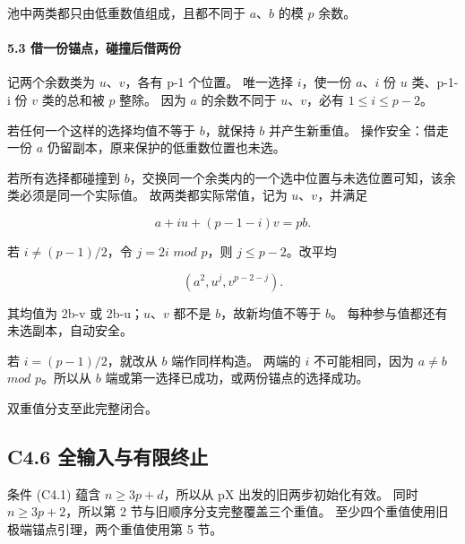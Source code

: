 \documentclass[11pt,a4paper]{article}
\theoremstyle{definition}
\numberwithin{equation}{section}
\begin{document}
{池中两类都只由低重数值组成，且都不同于} {\ensuremath{a}、\ensuremath{b}} {的模} {\ensuremath{p}} {余数。}

\paragraph*{\texorpdfstring{{5.3} {借一份锚点，碰撞后借两份}}{5.3 借一份锚点，碰撞后借两份}}\label{C4-h26}

{记两个余数类为} {\ensuremath{u}、\ensuremath{v}，各有} {p-1} {个位置。} {唯一选择} {\ensuremath{i}，使一份} {\ensuremath{a}、\ensuremath{i}} {份} {\ensuremath{u}} {类、p-1-i} {份} {\ensuremath{v}} {类的总和被} {\ensuremath{p}} {整除。} {因为} {\ensuremath{a}} {的余数不同于} {\ensuremath{u}、\ensuremath{v}，必有} {\ensuremath{1\le i\le p-2}。}

{若任何一个这样的选择均值不等于} {\ensuremath{b}，就保持} {\ensuremath{b}} {并产生新重值。} {操作安全：借走一份} {\ensuremath{a}} {仍留副本，原来保护的低重数位置也未选。}

{若所有选择都碰撞到} {\ensuremath{b}，交换同一个余类内的一个选中位置与未选位置可知，该余类必须是同一个实际值。} {故两类都实际常值，记为} {\ensuremath{u}、\ensuremath{v}，并满足}

\[
a+i u+(p-1-i)v=pb.
\tag{C4.12}
\]

{若} {\ensuremath{i\ne (p-1)/2}，令} {\ensuremath{j=2i}} {\ensuremath{mod}} {\ensuremath{p}，则} {\ensuremath{j\le p-2}。改平均}

\[
(a^2,u^j,v^{p-2-j}).
\tag{C4.13}
\]

{其均值为} {2b-v} {或} {2b-u；\ensuremath{u}、\ensuremath{v}} {都不是} {\ensuremath{b}，故新均值不等于} {\ensuremath{b}。} {每种参与值都还有未选副本，自动安全。}

{若} {\ensuremath{i=(p-1)/2}，就改从} {\ensuremath{b}} {端作同样构造。} {两端的} {\ensuremath{i}} {不可能相同，因为} {\ensuremath{a\ne b}} {\ensuremath{mod}} {\ensuremath{p}。所以从} {\ensuremath{b}} {端或第一选择已成功，或两份锚点的选择成功。}

{双重值分支至此完整闭合。}

\subsection*{\texorpdfstring{{C4.6} {全输入与有限终止}}{C4.6 全输入与有限终止}}\label{C4-h27}

{条件} {(C4.1)} {蕴含} {\ensuremath{n\ge 3p+d}，所以从} {pX} {出发的旧两步初始化有效。} {同时} {\ensuremath{n\ge 3p+2}，所以第} {2} {节与旧顺序分支完整覆盖三个重值。} {至少四个重值使用旧极端锚点引理，两个重值使用第} {5} {节。}
\end{document}
